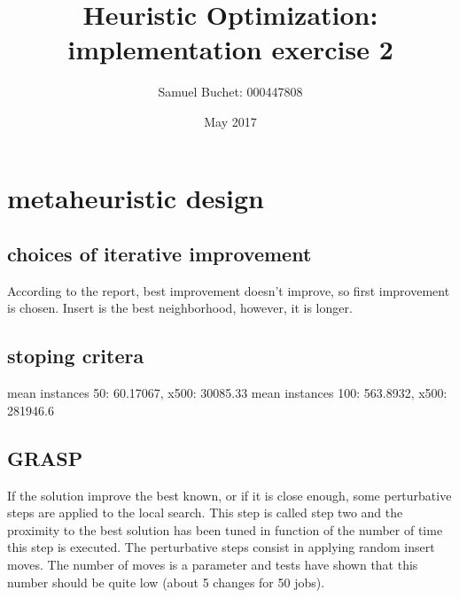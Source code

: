 \documentclass{article}
\title{Heuristic Optimization: implementation exercise 2}
\author{Samuel Buchet: 000447808}
\date{May 2017}
\begin{document}
\maketitle

\section{metaheuristic design}

\subsection{choices of iterative improvement}

According to the report, best improvement doesn't improve, so first improvement is chosen.
Insert is the best neighborhood, however, it is longer.

\subsection{stoping critera}

mean instances 50: 60.17067, x500: 30085.33\newline
mean instances 100: 563.8932, x500: 281946.6

\subsection{GRASP}

If the solution improve the best known, or if it is close enough, some perturbative steps are applied to the local search.
This step is called step two and the proximity to the best solution has been tuned in function of the number of time this step is executed.
The perturbative steps consist in applying random insert moves.
The number of moves is a parameter and tests have shown that this number should be quite low (about 5 changes for 50 jobs).
\end{document}
